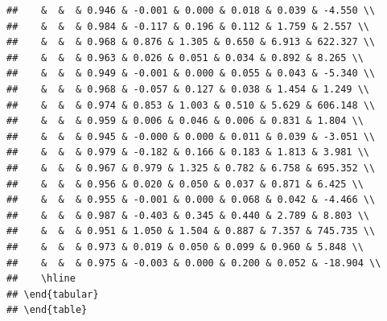 \documentclass{svjour3}\usepackage[]{graphicx}\usepackage[]{color}
\makeatletter
\newenvironment{kframe}{%
 \def\at@end@of@kframe{}%
 \ifinner\ifhmode%
  \def\at@end@of@kframe{\end{minipage}}%
  \begin{minipage}{\columnwidth}%
 \fi\fi%
 \def\FrameCommand##1{\hskip\@totalleftmargin \hskip-\fboxsep
 \colorbox{shadecolor}{##1}\hskip-\fboxsep
     \hskip-\linewidth \hskip-\@totalleftmargin \hskip\columnwidth}%
 \MakeFramed {\advance\hsize-\width
   \@totalleftmargin\z@ \linewidth\hsize
   \@setminipage}}%
 {\par\unskip\endMakeFramed%
 \at@end@of@kframe}
\newenvironment{knitrout}{}{} %
\makeatother
\begin{document}
\begin{knitrout}
\begin{kframe}
\begin{verbatim}
##    &  &  & 0.946 & -0.001 & 0.000 & 0.018 & 0.039 & -4.550 \\ 
##    &  &  & 0.984 & -0.117 & 0.196 & 0.112 & 1.759 & 2.557 \\ 
##    &  &  & 0.968 & 0.876 & 1.305 & 0.650 & 6.913 & 622.327 \\ 
##    &  &  & 0.963 & 0.026 & 0.051 & 0.034 & 0.892 & 8.265 \\ 
##    &  &  & 0.949 & -0.001 & 0.000 & 0.055 & 0.043 & -5.340 \\ 
##    &  &  & 0.968 & -0.057 & 0.127 & 0.038 & 1.454 & 1.249 \\ 
##    &  &  & 0.974 & 0.853 & 1.003 & 0.510 & 5.629 & 606.148 \\ 
##    &  &  & 0.959 & 0.006 & 0.046 & 0.006 & 0.831 & 1.804 \\ 
##    &  &  & 0.945 & -0.000 & 0.000 & 0.011 & 0.039 & -3.051 \\ 
##    &  &  & 0.979 & -0.182 & 0.166 & 0.183 & 1.813 & 3.981 \\ 
##    &  &  & 0.967 & 0.979 & 1.325 & 0.782 & 6.758 & 695.352 \\ 
##    &  &  & 0.956 & 0.020 & 0.050 & 0.037 & 0.871 & 6.425 \\ 
##    &  &  & 0.955 & -0.001 & 0.000 & 0.068 & 0.042 & -4.466 \\ 
##    &  &  & 0.987 & -0.403 & 0.345 & 0.440 & 2.789 & 8.803 \\ 
##    &  &  & 0.951 & 1.050 & 1.504 & 0.887 & 7.357 & 745.735 \\ 
##    &  &  & 0.973 & 0.019 & 0.050 & 0.099 & 0.960 & 5.848 \\ 
##    &  &  & 0.975 & -0.003 & 0.000 & 0.200 & 0.052 & -18.904 \\ 
##    \hline
## \end{tabular}
## \end{table}
\end{verbatim}
\end{kframe}
\end{knitrout}
\end{document}
